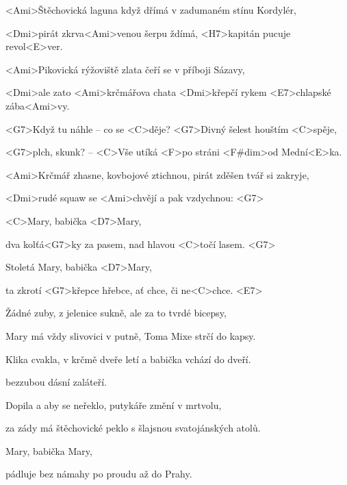 

\zs
<Ami>Štěchovická laguna když dřímá v zadumaném stínu Kordylér, 

<Dmi>pirát zkrva<Ami>venou šerpu ždímá, <H7>kapitán pucuje revol<E>ver. 

\bigskip

<Ami>Pikovická rýžoviště zlata čeří se v příboji Sázavy, 

<Dmi>ale zato <Ami>krčmářova chata <Dmi>křepčí rykem <E7>chlapské zába<Ami>vy. 

\bigskip

<G7>Když tu náhle -- co se <C>děje? <G7>Divný šelest houštím <C>spěje, 

<G7>plch, skunk? -- <C>Vše utíká <F>po stráni <F#dim>od Mední<E>ka. 

\bigskip

<Ami>Krčmář zhasne, kovbojové ztichnou, pirát zděšen tvář si zakryje, 

<Dmi>rudé squaw se <Ami>chvějí a pak vzdychnou:
<G7> \ks

\zr
<C>Mary, babička <D7>Mary, 

dva kolťá<G7>ky za pasem, nad hlavou <C>točí lasem. <G7>

Stoletá Mary, babička <D7>Mary, 

ta zkrotí <G7>křepce hřebce, ať chce, či ne<C>chce. <E7> 
\kr

\zs
Žádné zuby, z jelenice sukně, ale za to tvrdé bicepsy, 

Mary má vždy slivovici v putně, Toma Mixe strčí do kapsy. 

\bigskip

Klika cvakla, v krčmě dveře letí a babička vchází do dveří.

 bezzubou dásní zaláteří. 

\bigskip


\bigskip

Dopila a aby se neřeklo, putykáře změní v mrtvolu, 

za zády má štěchovické peklo s šlajsnou svatojánských atolů. 
\ks

\zr
Mary, babička Mary, 

pádluje bez námahy po proudu až do Prahy. 


